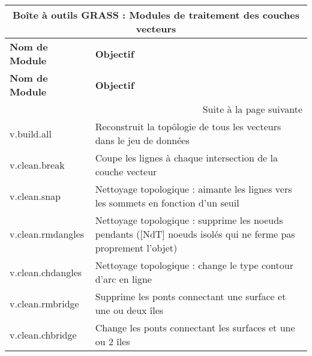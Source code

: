 \begin{table}[H]
\centering
{\setlength{\extrarowheight}{10pt}
\small
\begin{longtable}{|p{2.5cm}|p{11.5cm}|}
\hline \multicolumn{2}{|c|}{\textbf{Boîte à outils GRASS : Modules de traitement des couches vecteurs}} \\
\hline \textbf{Nom de Module}&\textbf{Objectif}\\
\endfirsthead
\textbf{Nom de Module}&\textbf{Objectif}\\
\endhead
\hline \multicolumn{2}{|r|}{{Suite à la page suivante}} \\ \hline
\endfoot
\hline
\endlastfoot
  \hline v.build.all & Reconstruit la top\^ologie de tous les vecteurs dans le jeu de données\\
  \hline v.clean.break & Coupe les lignes à chaque intersection de la couche vecteur\\
  \hline v.clean.snap & Nettoyage topologique : aimante les lignes vers les sommets en fonction d'un seuil\\
  \hline v.clean.rmdangles & Nettoyage topologique : supprime les noeuds pendants ([NdT] noeuds isolés qui ne ferme pas proprement l'objet) \\
  \hline v.clean.chdangles & Nettoyage topologique : change le type contour d'arc en ligne \\
  \hline v.clean.rmbridge & Supprime les ponts connectant une surface et une ou deux îles\\
  \hline v.clean.chbridge & Change les ponts connectant les surfaces et une ou 2 îles \\

\end{longtable}}
\end{table}
